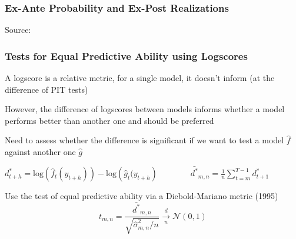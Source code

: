 \documentclass{beamer}
\newenvironment{wideitemize}{\itemize\addtolength{\itemsep}{10pt}}{\enditemize}
\begin{document}
\begin{frame}
  \frametitle{Ex-Ante Probability and Ex-Post Realizations }

  \hspace*{15pt}\hbox{\scriptsize Source:}        
  
\end{frame}


\begin{frame}
  \frametitle{Tests for Equal Predictive Ability using Logscores}
  \begin{wideitemize}
    \item A logscore is a relative metric, for a single model, it doesn't inform (at the difference of PIT tests)
    \item However, the difference of logscores between models informs whether a model performs better than another one and should be preferred
    \item Need to assess whether the difference is significant if we want to test a model $\hat{f}$ against another one $\hat{g}$
    \item $d^{*}_{t+h} = \text{log}\left(\hat{f}_t(y_{t+h})\right) - \text{log}\left(\hat{g}_t(y_{t+h} \right) \qquad \qquad \bar{d^*}_{m, n} = \frac{1}{n} \sum_{t=m}^{T-1} d^{*}_{t+1}$
    \item Use the test of equal predictive ability via a Diebold-Mariano metric (1995)
      \begin{equation*}
        t_{m,n} = \frac{\bar{d^*}_{m, n}}{\sqrt{\hat{\sigma}^2_{m,n}/n}} \xrightarrow[n]{d} \mathcal{N}(0, 1)
      \end{equation*}
  \end{wideitemize}
\end{frame}
\end{document}
